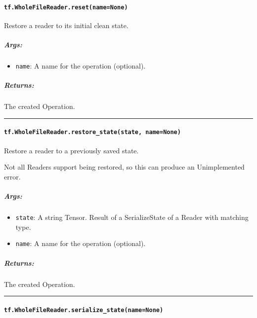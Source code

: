 \paragraph{\texorpdfstring{\texttt{tf.WholeFileReader.reset(name=None)}
}{tf.WholeFileReader.reset(name=None) }}\label{tf.wholefilereader.resetnamenone}

Restore a reader to its initial clean state.

\subparagraph{Args: }\label{args-19}

\begin{itemize}
\tightlist
\item
  \texttt{name}: A name for the operation (optional).
\end{itemize}

\subparagraph{Returns: }\label{returns-16}

The created Operation.

\begin{center}\rule{0.5\linewidth}{\linethickness}\end{center}

\paragraph{\texorpdfstring{\texttt{tf.WholeFileReader.restore\_state(state,\ name=None)}
}{tf.WholeFileReader.restore\_state(state, name=None) }}\label{tf.wholefilereader.restoreux5fstatestate-namenone}

Restore a reader to a previously saved state.

Not all Readers support being restored, so this can produce an
Unimplemented error.

\subparagraph{Args: }\label{args-20}

\begin{itemize}
\tightlist
\item
  \texttt{state}: A string Tensor. Result of a SerializeState of a
  Reader with matching type.
\item
  \texttt{name}: A name for the operation (optional).
\end{itemize}

\subparagraph{Returns: }\label{returns-17}

The created Operation.

\begin{center}\rule{0.5\linewidth}{\linethickness}\end{center}

\paragraph{\texorpdfstring{\texttt{tf.WholeFileReader.serialize\_state(name=None)}
}{tf.WholeFileReader.serialize\_state(name=None) }}\label{tf.wholefilereader.serializeux5fstatenamenone}

